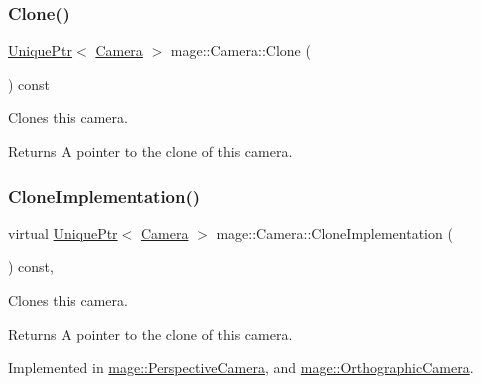 \subsubsection{\texorpdfstring{Clone()}{Clone()}}
{\footnotesize\ttfamily \hyperlink{namespacemage_a3316d7143a973e37adf1110f2e80ca31}{Unique\+Ptr}$<$ \hyperlink{classmage_1_1_camera}{Camera} $>$ mage\+::\+Camera\+::\+Clone (\begin{DoxyParamCaption}{ }\end{DoxyParamCaption}) const}

Clones this camera.

\begin{DoxyReturn}{Returns}
A pointer to the clone of this camera. 
\end{DoxyReturn}
\hypertarget{classmage_1_1_camera_aedf6e7d6ee6c6e9e82da814ef8e705ab}{}\label{classmage_1_1_camera_aedf6e7d6ee6c6e9e82da814ef8e705ab} 
\subsubsection{\texorpdfstring{Clone\+Implementation()}{CloneImplementation()}}
{\footnotesize\ttfamily virtual \hyperlink{namespacemage_a3316d7143a973e37adf1110f2e80ca31}{Unique\+Ptr}$<$ \hyperlink{classmage_1_1_camera}{Camera} $>$ mage\+::\+Camera\+::\+Clone\+Implementation (\begin{DoxyParamCaption}{ }\end{DoxyParamCaption}) const\hspace{0.3cm}{\ttfamily [private]}, {}}

Clones this camera.

\begin{DoxyReturn}{Returns}
A pointer to the clone of this camera. 
\end{DoxyReturn}


Implemented in \hyperlink{classmage_1_1_perspective_camera_aa597ab884256b7e6fad63653af3ac789}{mage\+::\+Perspective\+Camera}, and \hyperlink{classmage_1_1_orthographic_camera_aeef89cff8f4272b1412fa3ce366e656d}{mage\+::\+Orthographic\+Camera}.

\hypertarget{classmage_1_1_camera_a47e6801d228891453540b0c1e787724a}{}\label{classmage_1_1_camera_a47e6801d228891453540b0c1e787724a} 
